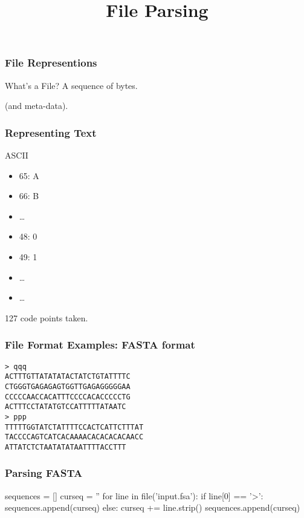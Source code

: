 
\title{File Parsing}

\frame{\maketitle}

\begin{frame}[fragile]
\frametitle{File Representions}
\begin{block}{What's a File?}
A sequence of bytes.

\bigskip
(and meta-data).
\end{block}
\end{frame}

\begin{frame}[fragile]
\frametitle{Representing Text}
\begin{block}{ASCII}
\begin{itemize}
\item 65: A
\item 66: B
\item \ldots
\item 48: 0
\item 49: 1
\item \ldots
\item \ldots
\end{itemize}

127 code points taken.
\end{block}
\end{frame}

\begin{frame}[fragile]
\frametitle{File Format Examples: FASTA format}
\begin{verbatim}
> qqq
ACTTTGTTATATATACTATCTGTATTTTC
CTGGGTGAGAGAGTGGTTGAGAGGGGGAA
CCCCCAACCACATTTCCCCACACCCCCTG
ACTTTCCTATATGTCCATTTTTATAATC
> ppp
TTTTTGGTATCTATTTTCCACTCATTCTTTAT
TACCCCAGTCATCACAAAACACACACACAACC
ATTATCTCTAATATATAATTTTACCTTT
\end{verbatim}
\end{frame}

\begin{frame}[fragile]
\frametitle{Parsing FASTA}

\begin{python}
sequences = []
curseq = ''
for line in file('input.fsa'):
    if line[0] == '>':
        sequences.append(curseq)
    else:
        curseq += line.strip()
sequences.append(curseq)
\end{python}
\end{frame}

